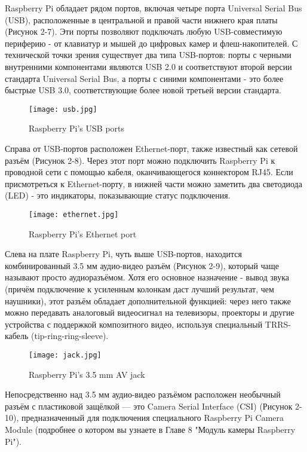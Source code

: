 Raspberry Pi обладает рядом портов, включая четыре порта Universal Serial Bus (USB), расположенные в центральной и правой части нижнего края платы (Рисунок 2-7). Эти порты позволяют подключать любую USB-совместимую периферию - от клавиатур и мышей до цифровых камер и флеш-накопителей. С технической точки зрения существует два типа USB-портов: порты с черными внутренними компонентами являются USB 2.0 и соответствуют второй версии стандарта Universal Serial Bus, а порты с синими компонентами - это более быстрые USB 3.0, соответствующие более новой третьей версии стандарта.

\begin{figure}[H]
	\centering
	\texttt{[image: usb.jpg]}
	\caption{Raspberry Pi’s USB ports}
\end{figure}

Справа от USB-портов расположен Ethernet-порт, также известный как сетевой разъём (Рисунок 2-8). Через этот порт можно подключить Raspberry Pi к проводной сети с помощью кабеля, оканчивающегося коннектором RJ45. Если присмотреться к Ethernet-порту, в нижней части можно заметить два светодиода (LED) - это индикаторы, показывающие статус подключения.

\begin{figure}[H]
	\centering
	\texttt{[image: ethernet.jpg]}
	\caption{Raspberry Pi’s Ethernet port}
\end{figure}

Слева на плате Raspberry Pi, чуть выше USB-портов, находится комбинированный 3.5 мм аудио-видео разъём (Рисунок 2-9), который чаще называют просто аудиоразъёмом. Хотя его основное назначение - вывод звука (причём подключение к усиленным колонкам даст лучший результат, чем наушники), этот разъём обладает дополнительной функцией: через него также можно передавать аналоговый видеосигнал на телевизоры, проекторы и другие устройства с поддержкой композитного видео, используя специальный TRRS-кабель (tip-ring-ring-sleeve).

\begin{figure}[H]
	\centering
	\texttt{[image: jack.jpg]}
	\caption{Raspberry Pi’s 3.5 mm AV jack}
\end{figure}

Непосредственно над 3.5 мм аудио-видео разъёмом расположен необычный разъём с пластиковой защёлкой — это Camera Serial Interface (CSI) (Рисунок 2-10), предназначенный для подключения специального Raspberry Pi Camera Module (подробнее о котором вы узнаете в Главе 8 "Модуль камеры Raspberry Pi").

